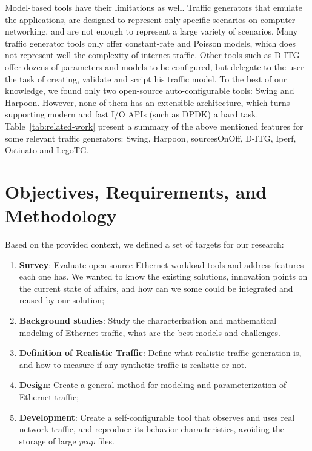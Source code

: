 Model-based tools have their limitations as well. Traffic generators that emulate the applications,  are designed to represent only specific scenarios on computer networking, and are not enough to represent a large variety of scenarios. Many  traffic generator tools only offer constant-rate and Poisson models, which does not represent well the complexity of internet traffic\cite{selfsimilar-ethernet}. Other tools such as D-ITG offer dozens of parameters and models to be configured, but delegate to the user the task of creating, validate and script his traffic model. To the best of our knowledge, we found only two open-source auto-configurable tools: Swing and Harpoon.  However, none of them has an extensible architecture, which turns supporting modern and fast \acrshort{I/O} \acrshort{API}s (such as DPDK\cite{web-dpdk}) a hard task. Table~\ref{tab:related-work} present a summary of the above mentioned features for some relevant traffic generators: Swing\cite{swing-paper}, Harpoon\cite{harpoon-validation}, sourcesOnOff\cite{sourcesonoff-paper}, D-ITG\cite{ditg-paper}, Iperf\cite{web-iperf}, Ostinato\cite{web-ostinato} and LegoTG\cite{legotg-paper}.


\section{Objectives, Requirements, and Methodology}


Based on the provided context, we defined a set of targets for our research:


\begin{enumerate}

	\item \textbf{Survey}: Evaluate open-source Ethernet workload tools and address features each one has. We wanted to know the existing solutions, innovation points on the current state of affairs, and how can we some could be integrated and reused by our solution;
	
	\item \textbf{Background studies}: Study the characterization and mathematical modeling of Ethernet traffic, what are the best models and challenges. 
	
	\item \textbf{Definition of Realistic Traffic}: Define what realistic traffic generation is, and how to measure if any synthetic traffic is realistic or not. 
	
	\item \textbf{Design}: Create a general method for modeling and parameterization of Ethernet traffic;
	
	\item \textbf{Development}:  Create a self-configurable tool that observes and uses real network traffic, and reproduce its behavior characteristics, avoiding the storage of large \textit{pcap} files. 
	
\end{enumerate}

